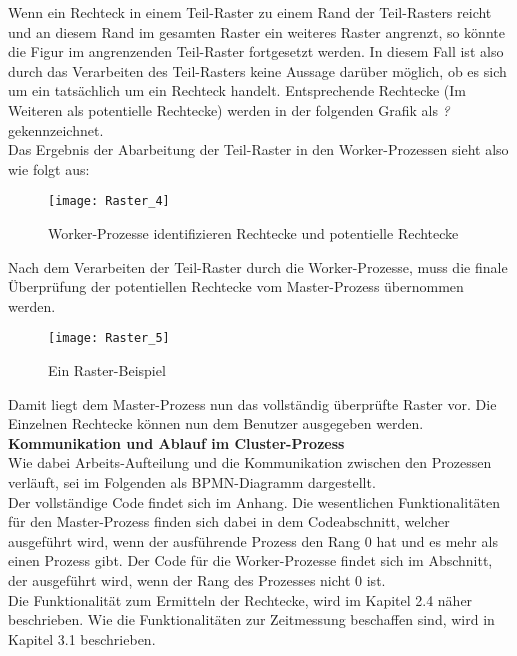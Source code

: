 \documentclass[
10pt, %
a4paper, %
oneside, %
headinclude,footinclude, %
BCOR5mm, %
]{scrartcl}
\begin{document}
Wenn ein Rechteck in einem Teil-Raster zu einem Rand der Teil-Rasters reicht und an diesem Rand im gesamten Raster ein weiteres Raster angrenzt, so könnte die Figur im angrenzenden Teil-Raster fortgesetzt werden. In diesem Fall ist also durch das Verarbeiten des Teil-Rasters keine Aussage darüber möglich, ob es sich um ein tatsächlich um ein Rechteck handelt. Entsprechende Rechtecke (Im Weiteren als potentielle Rechtecke) werden in der folgenden Grafik als \textit{?} gekennzeichnet.\\
Das Ergebnis der Abarbeitung der Teil-Raster in den Worker-Prozessen sieht also wie folgt aus:

\begin{figure}[h]
	\centering 
	\texttt{[image: Raster\_4]} 
	\caption[Cluster-Prozess: Worker-Prozess: Rechtecke und potentielle Rechtecke]{Worker-Prozesse identifizieren Rechtecke und potentielle Rechtecke}
\end{figure}

Nach dem Verarbeiten der Teil-Raster durch die Worker-Prozesse, muss die finale Überprüfung der potentiellen Rechtecke vom Master-Prozess übernommen werden.

\begin{figure}[h]
	\centering 
	\texttt{[image: Raster\_5]} 
	\caption[Cluster-Prozess: Beispiel-Raster]{Ein Raster-Beispiel }
\end{figure}

Damit liegt dem Master-Prozess nun das vollständig überprüfte Raster vor. Die Einzelnen Rechtecke können nun dem Benutzer ausgegeben werden.\\

\textbf{Kommunikation und Ablauf im Cluster-Prozess }\\
Wie dabei Arbeits-Aufteilung und die Kommunikation zwischen den Prozessen verläuft, sei im Folgenden als BPMN-Diagramm dargestellt.\\

Der vollständige Code findet sich im Anhang. Die wesentlichen Funktionalitäten für den Master-Prozess finden sich dabei in dem Codeabschnitt, welcher ausgeführt wird, wenn der ausführende Prozess den Rang 0 hat und es mehr als einen Prozess gibt. Der Code für die Worker-Prozesse findet sich im Abschnitt, der ausgeführt wird, wenn der Rang des Prozesses nicht 0 ist.\\

Die Funktionalität zum Ermitteln der Rechtecke, wird im Kapitel 2.4 näher beschrieben. Wie die Funktionalitäten zur Zeitmessung beschaffen sind, wird in Kapitel 3.1 beschrieben.
\end{document}
